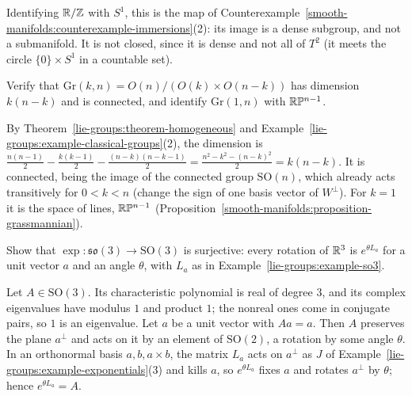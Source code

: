 \begin{solution}
Identifying $\mathbb{R}/\mathbb{Z}$ with $S^1$, this is the map of Counterexample~\ref{smooth-manifolds:counterexample-immersions}(2): its image is a dense subgroup, and not
a submanifold. It is not closed, since it is dense and not all of $T^2$ (it meets the circle $\{0\} \times S^1$ in a countable set).
\end{solution}

\begin{exercise}\label{lie-groups:exercise-grassmannian-dimension}
Verify that $\mathrm{Gr}(k, n) = O(n)/(O(k) \times O(n-k))$ has dimension $k(n-k)$ and is connected, and identify $\mathrm{Gr}(1, n)$ with $\mathbb{R}\mathbb{P}^{n-1}$.
\end{exercise}

\begin{solution}
By Theorem~\ref{lie-groups:theorem-homogeneous} and Example~\ref{lie-groups:example-classical-groups}(2), the dimension is
$\frac{n(n - 1)}{2} - \frac{k(k - 1)}{2} - \frac{(n - k)(n - k - 1)}{2} = \frac{n^2 - k^2 - (n - k)^2}{2} = k(n - k)$. It is connected, being the image of the
connected group $\mathrm{SO}(n)$, which already acts transitively for $0 < k < n$ (change the sign of one basis vector of $W^\perp$). For $k = 1$ it is the
space of lines, $\mathbb{R}\mathbb{P}^{n-1}$ (Proposition~\ref{smooth-manifolds:proposition-grassmannian}).
\end{solution}

\begin{exercise}\label{lie-groups:exercise-so3-exponential}
Show that $\exp \colon \mathfrak{so}(3) \to \mathrm{SO}(3)$ is surjective: every rotation of $\mathbb{R}^3$ is $e^{\theta L_a}$ for a unit vector $a$ and an angle
$\theta$, with $L_a$ as in Example~\ref{lie-groups:example-so3}.
\end{exercise}

\begin{solution}
Let $A \in \mathrm{SO}(3)$. Its characteristic polynomial is real of degree $3$, and its complex eigenvalues have modulus $1$ and product $1$; the nonreal ones come
in conjugate pairs, so $1$ is an eigenvalue. Let $a$ be a unit vector with $Aa = a$. Then $A$ preserves the plane $a^\perp$ and acts on it by an element of
$\mathrm{SO}(2)$, a rotation by some angle $\theta$. In an orthonormal basis $a, b, a \times b$, the matrix $L_a$ acts on $a^\perp$ as $J$ of
Example~\ref{lie-groups:example-exponentials}(3) and kills $a$, so $e^{\theta L_a}$ fixes $a$ and rotates $a^\perp$ by $\theta$; hence $e^{\theta L_a} = A$.
\end{solution}

